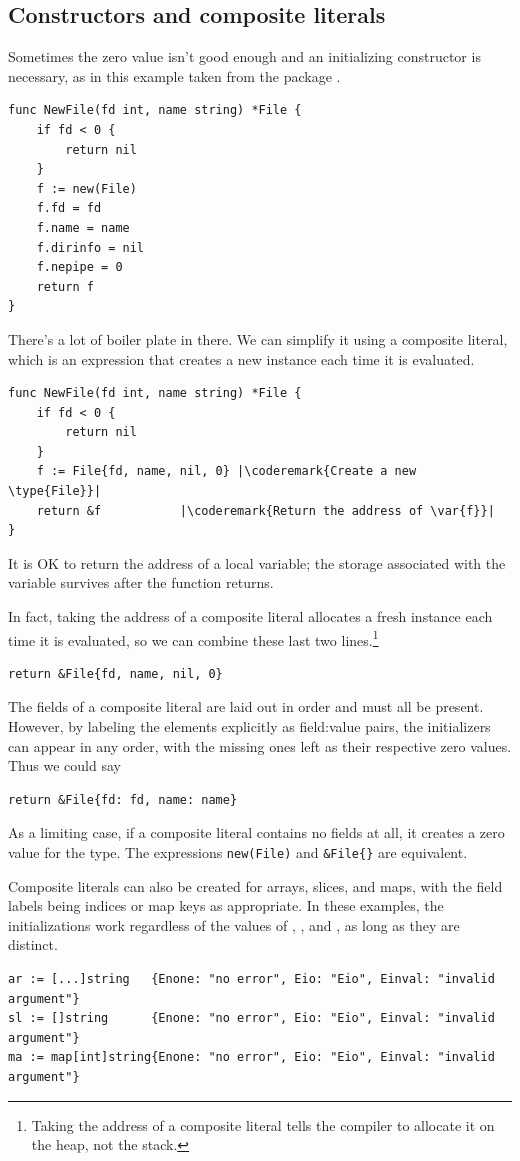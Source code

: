 \subsection{Constructors and composite literals}
Sometimes the zero value isn't good enough and an initializing
constructor is necessary, as in this example taken from the package
.
\begin{lstlisting}
func NewFile(fd int, name string) *File {
    if fd < 0 {
        return nil
    }
    f := new(File)
    f.fd = fd
    f.name = name
    f.dirinfo = nil
    f.nepipe = 0
    return f
}
\end{lstlisting}
There's a lot of boiler plate in there. We can simplify it using a
composite literal, which is an expression that creates a new instance
each time it is evaluated.

\begin{lstlisting}
func NewFile(fd int, name string) *File {
    if fd < 0 {
        return nil
    }
    f := File{fd, name, nil, 0}	|\coderemark{Create a new \type{File}}|
    return &f			|\coderemark{Return the address of \var{f}}|
}
\end{lstlisting}
It is OK to return the address of a local variable;
the storage associated with the variable survives after the function
returns.

In fact, taking the address of a composite literal allocates a
fresh instance each time it is evaluated, so we can combine these last
two lines.\footnote{Taking the address of a composite literal tells the 
compiler to allocate it on the heap, not the stack.}
\begin{lstlisting}
return &File{fd, name, nil, 0}
\end{lstlisting}
The fields of a composite literal are laid out in order and must all be
present. However, by labeling the elements explicitly as field:value
pairs, the initializers can appear in any order, with the missing ones
left as their respective zero values. Thus we could say

\begin{lstlisting}
return &File{fd: fd, name: name}
\end{lstlisting}
As a limiting case, if a composite literal contains no fields at all, it
creates a zero value for the type. The expressions
\lstinline{new(File)} and 
\lstinline|&File{}| are equivalent.

Composite literals can also be created for arrays, slices, and maps,
with the field labels being indices or map keys as appropriate. In these
examples, the initializations work regardless of the values of
,
, and , as long as they are distinct.
\begin{lstlisting}
ar := [...]string   {Enone: "no error", Eio: "Eio", Einval: "invalid argument"}
sl := []string      {Enone: "no error", Eio: "Eio", Einval: "invalid argument"}
ma := map[int]string{Enone: "no error", Eio: "Eio", Einval: "invalid argument"}
\end{lstlisting}

